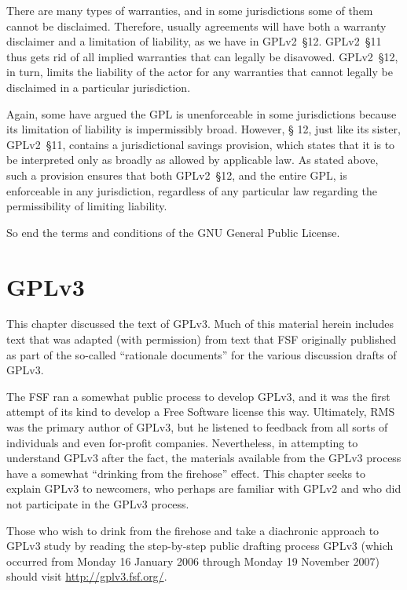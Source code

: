 There are many types of warranties, and in some jurisdictions some of them
cannot be disclaimed.  Therefore, usually agreements will have both a
warranty disclaimer and a limitation of liability, as we have in GPLv2~\S12.
GPLv2~\S11 thus gets rid of all implied warranties that can legally be
disavowed. GPLv2~\S12, in turn, limits the liability of the actor for any
warranties that cannot legally be disclaimed in a particular jurisdiction.

Again, some have argued the GPL is unenforceable in some jurisdictions
because its limitation of liability is impermissibly broad. However, \S
12, just like its sister, GPLv2~\S11, contains a jurisdictional savings
provision, which states that it is to be interpreted only as broadly as
allowed by applicable law.  As stated above, such a provision ensures that
both GPLv2~\S12, and the entire GPL, is enforceable in any jurisdiction,
regardless of any particular law regarding the permissibility of limiting
liability.

So end the terms and conditions of the GNU General Public License.

\chapter{GPLv3}
\label{GPLv3}

This chapter discussed the text of GPLv3.  Much of this material herein
includes text that was adapted (with permission) from text that FSF
originally published as part of the so-called ``rationale documents'' for the
various discussion drafts of GPLv3.

The FSF ran a somewhat public process to develop GPLv3, and it was the first
attempt of its kind to develop a Free Software license this way.  Ultimately,
RMS was the primary author of GPLv3, but he listened to feedback from all
sorts of individuals and even for-profit companies.  Nevertheless, in
attempting to understand GPLv3 after the fact, the materials available from
the GPLv3 process have a somewhat ``drinking from the firehose'' effect.
This chapter seeks to explain GPLv3 to newcomers, who perhaps are familiar
with GPLv2 and who did not participate in the GPLv3 process.

Those who wish to drink from the firehose and take a diachronic approach to
GPLv3 study by reading the step-by-step public drafting process GPLv3 (which
occurred from Monday 16 January 2006 through Monday 19 November 2007) should
visit \url{http://gplv3.fsf.org/}.

